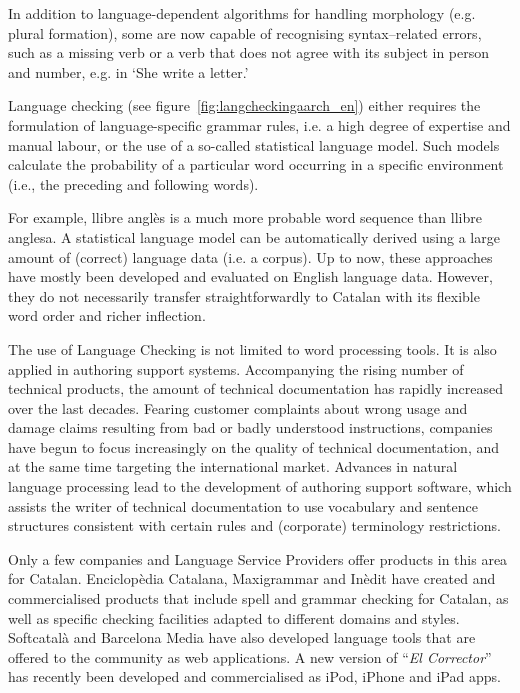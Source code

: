 \begin{multicols}{2}
In addition to language-dependent algorithms for handling morphology (e.g. plural formation), some are now capable of recognising syntax–related errors, such as a missing verb or a verb that does not agree with its subject in person and number, e.g. in ‘She write a letter.’ 

Language checking (see figure~\ref{fig:langcheckingaarch_en}) either requires the formulation of language-specific grammar rules, i.e. a high degree of expertise and manual labour, or the use of a so-called statistical language model. Such models calculate the probability of a particular word occurring in a specific environment (i.e., the preceding and following words).

For example, llibre anglès is a much more probable word sequence than llibre anglesa. A statistical language model can be automatically derived using a large amount of (correct) language data (i.e. a corpus). Up to now, these approaches have mostly been developed and evaluated on English language data. However, they do not necessarily transfer straightforwardly to Catalan with its flexible word order and richer inflection. 

The use of Language Checking is not limited to word processing tools. It is also applied in authoring support systems. Accompanying the rising number of technical products, the amount of technical documentation has rapidly increased over the last decades. Fearing customer complaints about wrong usage and damage claims resulting from bad or badly understood instructions, companies have begun to focus increasingly on the quality of technical documentation, and at the same time targeting the international market. Advances in natural language processing lead to the development of authoring support software, which assists the writer of technical documentation to use vocabulary and sentence structures consistent with certain rules and (corporate) terminology restrictions.

Only a few companies and Language Service Providers offer products in this area for Catalan. Enciclopèdia Catalana, Maxigrammar and Inèdit have created and commercialised products that include spell and grammar checking for Catalan, as well as specific checking facilities adapted to different domains and styles. Softcatalà and Barcelona Media have also developed language tools that are offered to the community as web applications. A new version of “\textit{El Corrector}” has recently been developed and commercialised as iPod, iPhone and iPad apps. 


\end{multicols}
